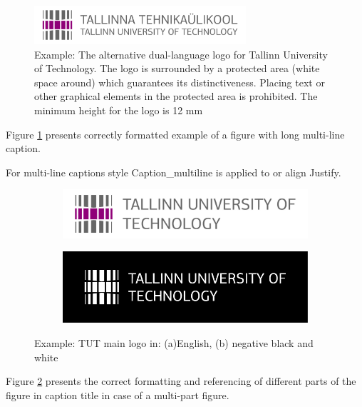\begin{figure}[!ht]
\centering
\includegraphics[width=0.7\textwidth]{figures/TTU_alternatiivne_logo_EST_ENG_print}
\caption{Example: The alternative dual-language logo for Tallinn University of Technology. The logo is surrounded by a protected area (white space around) which guarantees its distinctiveness. Placing text or other graphical elements in the protected area is prohibited. The minimum height for the logo is 12 mm}
\label{fig:logo2}
\end{figure}

Figure \ref{fig:logo2} presents correctly formatted example of a figure with long multi-line caption.


For multi-line captions style Caption\_multiline is applied to or align Justify.

\begin{figure}[!t]
\centering
	 \begin{subfigure}[b]{0.3\textwidth}
    \includegraphics[width=\textwidth]{figures/TTU_peamine_logo_ENG_print}
        \caption{}
    \end{subfigure}
    \qquad
    \begin{subfigure}[b]{0.3\textwidth}
    \includegraphics[width=\textwidth]{figures/ttu_peamine_logo_eng_must-valge_negatiivis}
        \caption{}
    \end{subfigure}
    \caption{Example: TUT main logo in: (a)English, (b) negative black and white}
    \label{fig:logo3}
\end{figure}

Figure \ref{fig:logo3} presents the correct formatting and referencing of different parts of the figure in
caption title in case of a multi-part figure.


